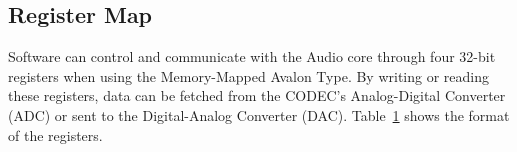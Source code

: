 \documentclass[11pt, twoside, pdftex]{article}
\begin{document}
\subsection{Register Map}

Software can control and communicate with the Audio core through four 32-bit
registers when using the Memory-Mapped \textsf{Avalon Type}. By writing or reading 
these registers, data can be fetched from the
CODEC's Analog-Digital Converter (ADC) or sent to the Digital-Analog Converter 
(DAC). Table~\hyperref[tab:regfiles]{1} shows the format of the registers.
\end{document}
